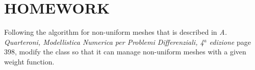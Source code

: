 \section*{HOMEWORK}

Following the algorithm for non-uniform meshes that is described in
\textit{A. Quarteroni, Modellistica Numerica per Problemi Differenziali, 4$^a$
edizione} page 398, modify the class  so that it can manage
non-uniform meshes with a given weight function.

